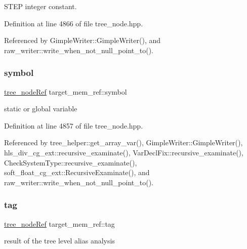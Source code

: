 S\+T\+EP integer constant. 



Definition at line 4866 of file tree\+\_\+node.\+hpp.



Referenced by Gimple\+Writer\+::\+Gimple\+Writer(), and raw\+\_\+writer\+::write\+\_\+when\+\_\+not\+\_\+null\+\_\+point\+\_\+to().

\mbox{\label{structtarget__mem__ref_af4ff7733b30e80c001a404f2b0662db9}} 
\subsubsection{\texorpdfstring{symbol}{symbol}}
{\footnotesize\ttfamily \hyperlink{tree__node_8hpp_a6ee377554d1c4871ad66a337eaa67fd5}{tree\+\_\+node\+Ref} target\+\_\+mem\+\_\+ref\+::symbol}



static or global variable 



Definition at line 4857 of file tree\+\_\+node.\+hpp.



Referenced by tree\+\_\+helper\+::get\+\_\+array\+\_\+var(), Gimple\+Writer\+::\+Gimple\+Writer(), hls\+\_\+div\+\_\+cg\+\_\+ext\+::recursive\+\_\+examinate(), Var\+Decl\+Fix\+::recursive\+\_\+examinate(), Check\+System\+Type\+::recursive\+\_\+examinate(), soft\+\_\+float\+\_\+cg\+\_\+ext\+::\+Recursive\+Examinate(), and raw\+\_\+writer\+::write\+\_\+when\+\_\+not\+\_\+null\+\_\+point\+\_\+to().

\mbox{\label{structtarget__mem__ref_a512eccf46776e6cc79b74577a1e825d9}} 
\subsubsection{\texorpdfstring{tag}{tag}}
{\footnotesize\ttfamily \hyperlink{tree__node_8hpp_a6ee377554d1c4871ad66a337eaa67fd5}{tree\+\_\+node\+Ref} target\+\_\+mem\+\_\+ref\+::tag}



result of the tree level alias analysis 



